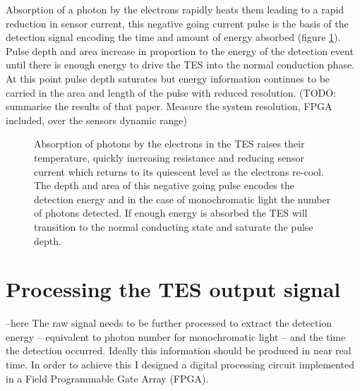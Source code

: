 \documentclass{article}
\begin{document}
Absorption of a photon by the electrons rapidly heats them leading to a rapid
reduction in sensor current, this negative going current pulse is the basis of
the detection signal encoding the time and amount of energy absorbed (figure
\ref{fig:detection}).
Pulse depth and area increase in proportion to the energy of the detection event
until there is enough energy to drive the TES into the normal conduction phase.
At this point pulse depth saturates but energy information continues to be
carried in the area and length of the pulse with
reduced resolution\cite{2014JOSAB..31B..20L}.
(TODO: summarise the results of that paper. Measure the system resolution,
FPGA included, over the sensors dynamic range)


\begin{figure}[!hpbt]
\centering 
  
  \caption{
    Absorption of photons by the electrons in the TES raises their temperature,
    quickly increasing resistance and reducing sensor current which returns to
    its quiescent level as the electrons re-cool.
    The depth and area of this negative going pulse encodes the detection
    energy and in the case of monochromatic light the number of photons
    detected.
    If enough energy is absorbed the TES will transition to the normal
    conducting state and saturate the pulse depth.
  }
  \label{fig:detection}
\end{figure}


% 
% 
% 
\clearpage

\section{Processing the TES output signal}
--here
The raw signal needs to be further processed to extract the detection
energy -- equivalent to photon number for monochromatic
light -- and the time the detection occurred. Ideally this information should be
produced in near real time. In order to achieve this I designed a digital
processing circuit implemented in a Field Programmable Gate Array (FPGA).  
\end{document}
